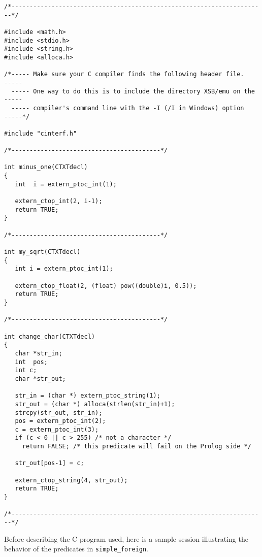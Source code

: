 \begin{small}
\begin{verbatim}
/*----------------------------------------------------------------------*/

#include <math.h>
#include <stdio.h>
#include <string.h>
#include <alloca.h>

/*----- Make sure your C compiler finds the following header file.    -----
  ----- One way to do this is to include the directory XSB/emu on the -----
  ----- compiler's command line with the -I (/I in Windows) option    -----*/

#include "cinterf.h"

/*-----------------------------------------*/

int minus_one(CTXTdecl)
{
   int  i = extern_ptoc_int(1);

   extern_ctop_int(2, i-1);
   return TRUE;
}

/*-----------------------------------------*/

int my_sqrt(CTXTdecl)
{
   int i = extern_ptoc_int(1);

   extern_ctop_float(2, (float) pow((double)i, 0.5));
   return TRUE;
}

/*-----------------------------------------*/

int change_char(CTXTdecl)
{
   char *str_in;
   int  pos;
   int c;
   char *str_out;

   str_in = (char *) extern_ptoc_string(1);
   str_out = (char *) alloca(strlen(str_in)+1);
   strcpy(str_out, str_in);
   pos = extern_ptoc_int(2);
   c = extern_ptoc_int(3);
   if (c < 0 || c > 255) /* not a character */
     return FALSE; /* this predicate will fail on the Prolog side */

   str_out[pos-1] = c;

   extern_ctop_string(4, str_out);  
   return TRUE;
}

/*----------------------------------------------------------------------*/
\end{verbatim}
\end{small}

Before describing the C program used, here is a sample session
illustrating the behavior of the predicates in {\tt simple\_foreign}.


